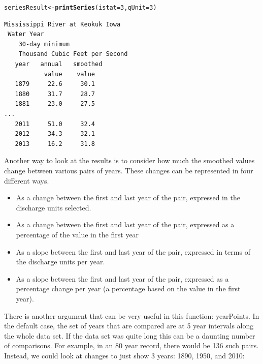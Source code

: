 \documentclass[a4paper,11pt]{article}\usepackage{graphicx, color}
\makeatletter
\newcommand{\hlfunctioncall}[1]{\textcolor[rgb]{0.501960784313725,0,0.329411764705882}{\textbf{#1}}}%
\newenvironment{kframe}{%
 \def\at@end@of@kframe{}%
 \ifinner\ifhmode%
  \def\at@end@of@kframe{\end{minipage}}%
  \begin{minipage}{\columnwidth}%
 \fi\fi%
 \def\FrameCommand##1{\hskip\@totalleftmargin \hskip-\fboxsep
 \colorbox{shadecolor}{##1}\hskip-\fboxsep
     \hskip-\linewidth \hskip-\@totalleftmargin \hskip\columnwidth}%
 \MakeFramed {\advance\hsize-\width
   \@totalleftmargin\z@ \linewidth\hsize
   \@setminipage}}%
 {\par\unskip\endMakeFramed%
 \at@end@of@kframe}
\newenvironment{knitrout}{}{} %
\makeatother
\begin{document}
\begin{knitrout}
\color{fgcolor}\begin{kframe}
\begin{alltt}
seriesResult <- \hlfunctioncall{printSeries}(istat=3, qUnit=3)
\end{alltt}
\end{kframe}
\end{knitrout}


\begin{verbatim}
Mississippi River at Keokuk Iowa
 Water Year
    30-day minimum
    Thousand Cubic Feet per Second
   year   annual   smoothed
           value    value
   1879     22.6     30.1
   1880     31.7     28.7
   1881     23.0     27.5
...
   2011     51.0     32.4
   2012     34.3     32.1
   2013     16.2     31.8
\end{verbatim}

Another way to look at the results is to consider how much the smoothed values change between various pairs of years.  These changes can be represented in four different ways.  
\begin{itemize}
  \item As a change between the first and last year of the pair, expressed in the discharge units selected.
  \item As a change between the first and last year of the pair, expressed as a percentage of the value in the first year
  \item As a slope between the first and last year of the pair, expressed in terms of the discharge units per year.
  \item As a slope between the first and last year of the pair, expressed as a percentage change per year (a percentage based on the value in the first year).
\end{itemize}

There is another argument that can be very useful in this function: yearPoints.  In the default case, the set of years that are compared are at 5 year intervals along the whole data set.  If the data set was quite long this can be a daunting number of comparisons.  For example, in an 80 year record, there would be 136 such pairs. Instead, we could look at changes to just show 3 years: 1890, 1950, and 2010: 
\end{document}
